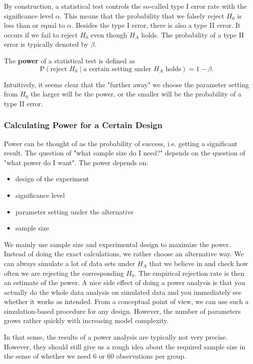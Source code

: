 By construction, a statistical test controls the so-called type I error rate with the significance level $\alpha$. This means that the probability that we falsely reject $H_0$ is less than or equal to $\alpha$. Besides the type I error, there is also a type II error. It occurs if we fail to reject $H_0$ even though $H_A$ holds. The probability of a type II error is typically denoted by $\beta$. \medskip

The \textbf{power} of a statistical test is defined as 
$$\text{P}(\text{reject } H_0 \; | \; \text{a certain setting under } H_A \text{ holds}) = 1 - \beta.$$

Intuitively, it seems clear that the "further away" we choose the parameter setting from $H_0$ the larger will be the power, or the smaller will be the probability of a type II error.

\subsubsection{Calculating Power for a Certain Design}

Power can be thought of as the probability of success, i.e. getting a significant result. The question of "what sample size do I need?" depends on the question of "what power do I want". The power depends on:
\begin{itemize}
	\item design of the experiment
	\item significance level
	\item parameter setting under the alternative
	\item sample size
\end{itemize}

We mainly use sample size and experimental design to maximize the power. Instead of doing the exact calculations, we rather choose an alternative way. We can always simulate a lot of data sets under $H_A$ that we believe in and check how often we are rejecting the corresponding $H_0$. The empirical rejection rate is then an estimate of the power. A nice side effect of doing a power analysis is that you actually do the whole data analysis on simulated data and you immediately see whether it works as intended. From a conceptual point of view, we can use such a simulation-based procedure for any design. However, the number of parameters grows rather quickly with increasing model complexity. \medskip

In that sense, the results of a power analysis are typically not very precise. However, they should still give us a rough idea about the required sample size in the sense of whether we need 6 or 60 observations per group.\medskip


